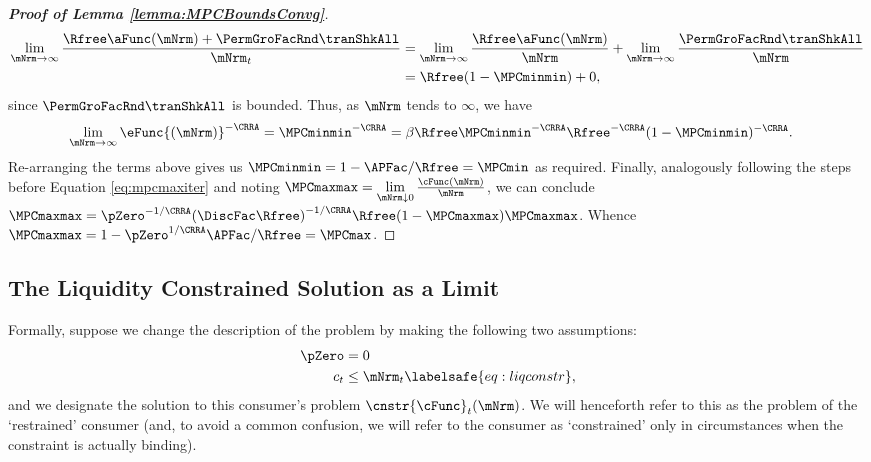\documentclass[\econtexRoot/BufferStockTheory]{subfiles}
\begin{document}
\begin{proof}[\textbf{Proof of Lemma \ref{lemma:MPCBoundsConvg}}]
\begin{align}
\lim_{\mNrm\rightarrow \infty}\frac{\Rfree \aFunc(\mNrm)+{\PermGroFacRnd}{\tranShkAll}}{\mNrm_{t}} &  = \lim_{\mNrm \rightarrow \infty}\frac{\Rfree \aFunc(\mNrm)}{\mNrm} + \lim_{\mNrm\rightarrow \infty}\frac{{\PermGroFacRnd}{\tranShkAll}}{\mNrm} \\
			& = \Rfree (1- \MPCminmin) + 0, 
\end{align}
since ${\PermGroFacRnd}{\tranShkAll}$ is bounded.
Thus, as $\mNrm$ tends to $\infty$, we have
%
\begin{equation}\begin{gathered}\begin{aligned} %
 \lim\limits_{\mNrm\rightarrow \infty}\eFunc{(\mNrm)}^{-\CRRA}  & =  \MPCminmin^{-\CRRA} = \beta\Rfree\MPCminmin^{-\CRRA}\Rfree^{-\CRRA} (1- \MPCminmin) ^{-\CRRA}. 
\end{aligned}\end{gathered}\end{equation}
%
Re-arranging the terms above gives us $\MPCminmin =1-  \APFac/\Rfree =  \MPCmin$ as required.
Finally, analogously following the steps before Equation \eqref{eq:mpcmaxiter} and noting $\MPCmaxmax = \lim\limits_{\mNrm\downarrow 0}\frac{\cFunc(\mNrm)}{\mNrm}$, we can conclude $\MPCmaxmax  = \pZero^{-1/\CRRA} {(\DiscFac
\Rfree)}^{-1/\CRRA}\Rfree(1-\MPCmaxmax)\MPCmaxmax$.
Whence $\MPCmaxmax = 1- \pZero^{1/\CRRA}\APFac/\Rfree = \MPCmax$.




%
\end{proof}

\subsection{The Liquidity Constrained Solution as a Limit}\label{sec:LiqConstrAsLimit}

Formally, suppose we change the description of the problem by making
the following two assumptions:
\begin{eqnarray*}
  \pZero   & = 0
  \\  c_{t} & \leq  \mNrm_{t} \labelsafe{eq:liqconstr},
\end{eqnarray*}
and we designate the solution to this consumer's problem $\cnstr{\cFunc}_{t}(\mNrm)$.
We will henceforth refer to this as the problem of the `restrained' consumer (and, to avoid a common confusion, we will refer to the consumer as `constrained' only in circumstances when the constraint is actually binding).
\end{document}
